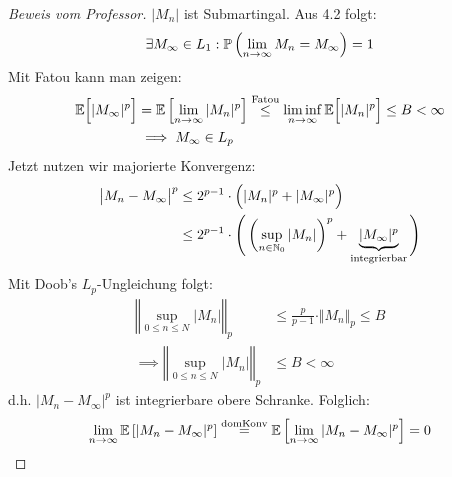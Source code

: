 \documentclass[12pt,a4paper]{article}
\begin{document}
\begin{proof}[Beweis vom Professor]\enter
$|M_n|$ ist Submartingal. Aus 4.2 folgt:
\begin{align*}
\exists M_\infty\in L_1:\mathbb{P}\left(\lim\limits_{n\to\infty} M_n=M_\infty\right)=1
\end{align*}
Mit Fatou kann man zeigen:
\begin{align*}
\mathbb{E}\Big[|M_\infty|^p\Big]
&=\mathbb{E}\left[\lim\limits_{n\to\infty} |M_n|^p\right]
\stackrel{\text{Fatou}}{\leq}
\liminf\limits_{n\to\infty}\mathbb{E}\Big[|M_n|^p\Big]\leq B<\infty\\
&\implies M_\infty\in L_p
\end{align*}
Jetzt nutzen wir majorierte Konvergenz:
\begin{align*}
\big|M_n-M_\infty\big|^p
&\leq
2^{p-1}\cdot\Big(|M_n|^p+|M_\infty|^p\Big)\\
&\leq 2^{p-1}\cdot\Bigg(\left(\sup\limits_{n\in\mathbb{N}_0}|M_n|\right)^p+\underbrace{|M_\infty|^p}_{\text{integrierbar}}\Bigg)
\end{align*}
Mit Doob's $L_p$-Ungleichung folgt:
\begin{align*}
\left\Vert\sup\limits_{0\leq n\leq N}|M_n|\right\Vert_p
&\leq \frac{p}{p-1}\cdot\Vert M_n\Vert_p\leq B\\
\implies
\left\Vert\sup\limits_{0\leq n\leq N}|M_n|\right\Vert_p
&\leq B<\infty
\end{align*}
d.h. $|M_n-M_\infty|^p$ ist integrierbare obere Schranke. Folglich:
\begin{align*}
\lim\limits_{n\to\infty}\mathbb{E}\left[|M_n-M_\infty|^p\right]
\stackrel{\text{domKonv}}{=}\mathbb{E}\left[\lim\limits_{n\to\infty}|M_n-M_\infty|^p\right]=0
\end{align*}
\end{proof}
\end{document}
